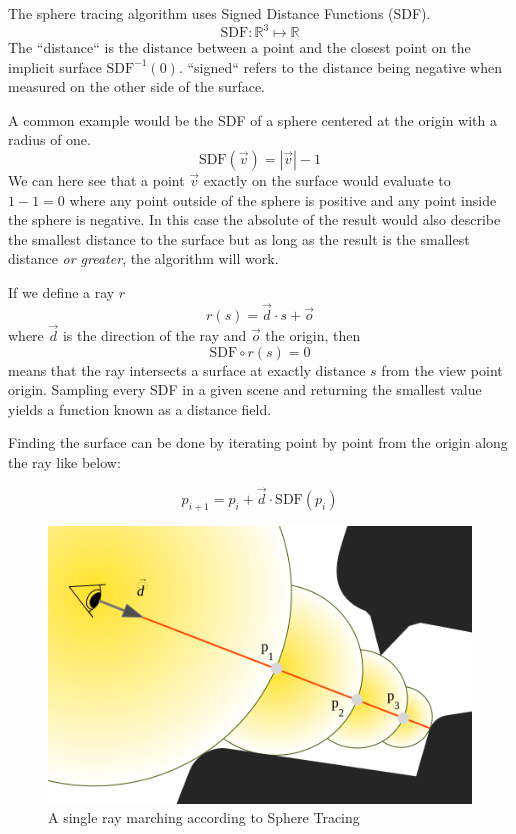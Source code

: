 		The sphere tracing algorithm uses Signed Distance Functions (SDF).
		$$\text{SDF}:\mathbb{R}^{3}\mapsto\mathbb{R}$$ The ``distance`` is the
		distance between a point and the closest point on the implicit surface
		$\text{SDF}^{-1}(0)$. ``signed`` refers to the distance being
		negative when measured on the other side of the surface. 

		A common example would be the SDF of a sphere centered at the origin with a
		radius of one. $$\text{SDF}(\vec{v}) = |\vec{v}| - 1$$ We can here see that
		a point $\vec{v}$ exactly on the surface would evaluate to $1 - 1 = 0$
		where any point outside of the sphere is positive and any point inside the
		sphere is negative. In this case the absolute of the result would also
		describe the smallest distance to the surface but as long as the result is
		the smallest distance \emph{or greater}, the algorithm will work.

		If we define a ray $r$ $$r(s) = \vec{d} \cdot s + \vec{o}$$
		where $\vec{d}$ is the direction of the ray and $\vec{o}$ the origin, then
		$$\text{SDF}\circ r(s) = 0$$ means that the ray intersects a surface at
		exactly distance $s$ from the view point origin. Sampling every SDF in a
		given scene and returning the smallest value yields a function known as a
		distance field.

		\bigskip \noindent Finding the surface can be done by iterating point by
		point from the origin along the ray like below: 
		
		$$p_{i+1} = p_i + \vec{d}\cdot \text{SDF}(p_i)$$ 
		
		\vspace{40pt}
		\begin{figure}
			\begin{flushright}
				\includegraphics[width=0.9\linewidth]{figure/SDF2} 
			\end{flushright}
			\caption{A single ray marching according to Sphere Tracing}
			\vspace{40pt}
		\end{figure}

